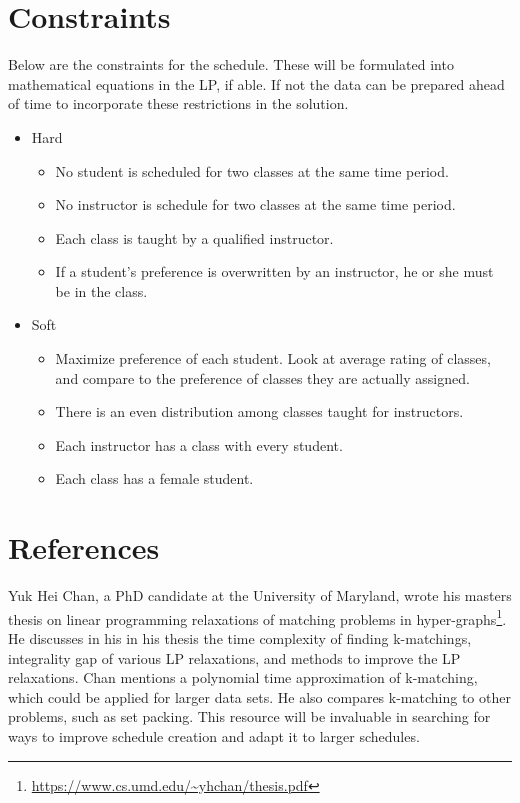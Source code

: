 \documentclass[11pt]{article}
\begin{document}
\section{Constraints}
Below are the constraints for the schedule. These will be formulated into mathematical equations in the LP, if able. If not the data can be prepared ahead of time to incorporate these restrictions in the solution.
\begin{itemize}
	\item Hard
	\begin{itemize}
		\item No student is scheduled for two classes at the same time period.
		\item No instructor is schedule for two classes at the same time period.
		\item Each class is taught by a qualified instructor.
		\item If a student's preference is overwritten by an instructor, he or she must be in the class.
	\end{itemize}
	\item Soft
	\begin{itemize}
	\item Maximize preference of each student. Look at average rating of classes, and compare to the preference of classes they are actually assigned.
	\item There is an even distribution among classes taught for instructors.
	\item Each instructor has a class with every student.
	\item Each class has a female student.
	\end{itemize}
\end{itemize}

\section{References}
Yuk Hei Chan, a PhD candidate at the University of Maryland, wrote his masters thesis on linear programming relaxations of matching problems in hyper-graphs\footnote{\url{https://www.cs.umd.edu/~yhchan/thesis.pdf}}. He discusses in his in his thesis the time complexity of finding k-matchings, integrality gap of various LP relaxations, and methods to improve the LP relaxations. Chan mentions a polynomial time approximation of k-matching, which could be applied for larger data sets. He also compares k-matching to other problems, such as set packing. This resource will be invaluable in searching for ways to improve schedule creation and adapt it to larger schedules.
\end{document}
